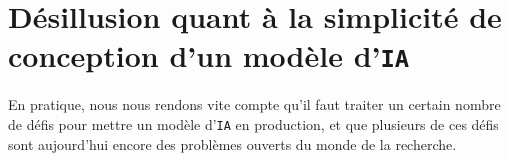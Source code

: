 		
	\section*{Désillusion quant à la simplicité de conception d'un modèle d'\texttt{IA}}
		
		En pratique, nous nous rendons vite compte qu'il faut traiter un certain nombre de défis pour mettre un modèle d'\texttt{IA} en production, et que plusieurs de ces défis sont aujourd'hui encore des problèmes ouverts du monde de la recherche.

		
		
		
